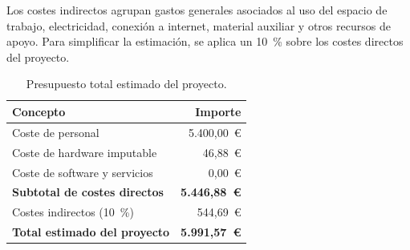 Los costes indirectos agrupan gastos generales asociados al uso del espacio de trabajo, electricidad, conexión a internet, material auxiliar y otros recursos de apoyo. Para simplificar la estimación, se aplica un 10~\% sobre los costes directos del proyecto.

\begin{table}[h!]
\centering
\small
\begin{tabular}{|p{7cm}|r|}
\hline
\textbf{Concepto} & \textbf{Importe} \\ \hline
Coste de personal               & 5.400,00~\euro \\ \hline
Coste de hardware imputable     & 46,88~\euro \\ \hline
Coste de software y servicios   & 0,00~\euro \\ \hline
\textbf{Subtotal de costes directos} & \textbf{5.446,88~\euro} \\ \hline
Costes indirectos (10~\%)       & 544,69~\euro \\ \hline
\textbf{Total estimado del proyecto} & \textbf{5.991,57~\euro} \\ \hline
\end{tabular}
\caption{Presupuesto total estimado del proyecto.}
\label{tab:presupuesto-total}
\end{table}
